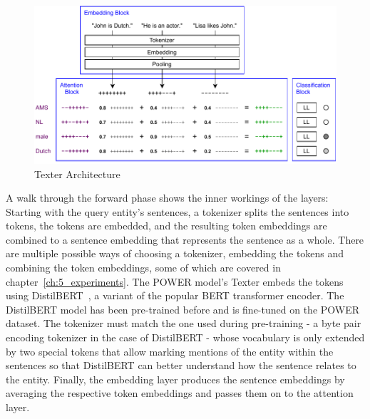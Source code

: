 \begin{figure}[t]
    \centering
    \includegraphics{4_approach/1_texter/2_attention_model/attention_architecture}
    \caption{Texter Architecture}
    \label{fig:4_approach/1_texter/2_attention_model/attention_architecture}
\end{figure}

A walk through the forward phase shows the inner workings of the layers: Starting with the query entity's sentences, a tokenizer splits the sentences into tokens, the tokens are embedded, and the resulting token embeddings are combined to a sentence embedding that represents the sentence as a whole. There are multiple possible ways of choosing a tokenizer, embedding the tokens and combining the token embeddings, some of which are covered in chapter~\ref{ch:5_experiments}. The POWER model's Texter embeds the tokens using DistilBERT~\cite{Sanh2019DistilBERTAD}, a variant of the popular BERT transformer encoder. The DistilBERT model has been pre-trained before and is fine-tuned on the POWER dataset. The tokenizer must match the one used during pre-training - a byte pair encoding tokenizer in the case of DistilBERT - whose vocabulary is only extended by two special tokens that allow marking mentions of the entity within the sentences so that DistilBERT can better understand how the sentence relates to the entity. Finally, the embedding layer produces the sentence embeddings by averaging the respective token embeddings and passes them on to the attention layer.

